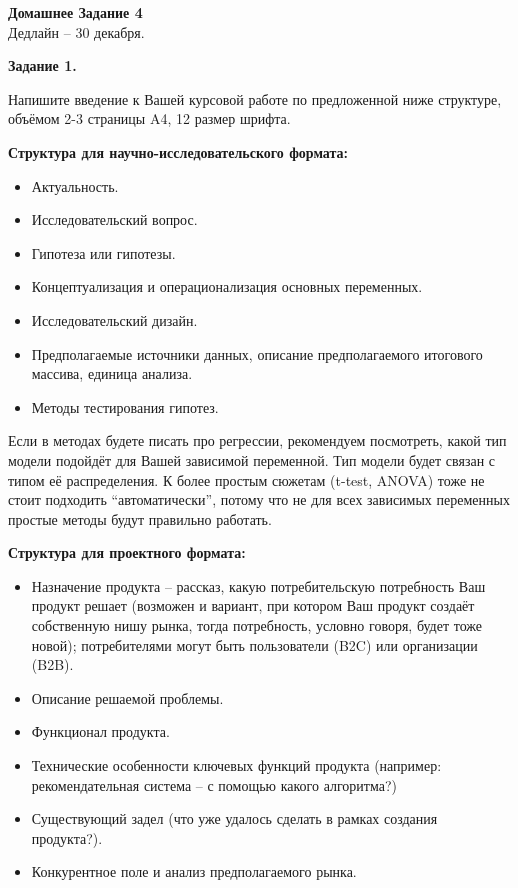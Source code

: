 \documentclass[12pt]{article}
\begin{document}
\begin{center}
\huge \textbf{Домашнее Задание 4} \\
\normalsize Дедлайн -- 30 декабря.  
\end{center}

\textbf{Задание 1.}

Напишите введение к Вашей курсовой работе по предложенной ниже структуре,  объёмом 2-3 страницы A4,  12 размер шрифта.  

\textbf{Структура для научно-исследовательского формата:}

\begin{itemize}
\item Актуальность. 
\item Исследовательский вопрос. 
\item Гипотеза или гипотезы.
\item Концептуализация и операционализация основных переменных.
\item Исследовательский дизайн.  
\item Предполагаемые источники данных,  описание предполагаемого итогового массива,  единица анализа.
\item Методы тестирования гипотез. 
\end{itemize} 

Если в методах будете писать про регрессии,  рекомендуем посмотреть,  какой тип модели подойдёт для Вашей зависимой переменной.  Тип модели будет связан с типом её распределения.  К более простым сюжетам (t-test,  ANOVA) тоже не стоит подходить ``автоматически'',  потому что не для всех зависимых переменных простые методы будут правильно работать. 

\textbf{Структура для проектного формата:}

\begin{itemize}
\item Назначение продукта -- рассказ,  какую потребительскую потребность Ваш продукт решает (возможен и вариант,  при котором Ваш продукт создаёт собственную нишу рынка,  тогда потребность,  условно говоря,  будет тоже новой); потребителями могут быть пользователи (B2C) или организации (B2B).  
\item Описание решаемой проблемы.  
\item Функционал продукта. 
\item Технические особенности ключевых функций продукта (например: рекомендательная система -- с помощью какого алгоритма?)
\item Существующий задел (что уже удалось сделать в рамках создания продукта?).   
\item Конкурентное поле и анализ предполагаемого рынка.
\end{itemize} 
\end{document}
